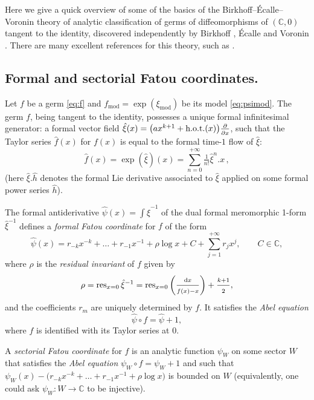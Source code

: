 \documentclass[a4paper,11pt]{amsart}
\numberwithin{equation}{section}
\newcommand{\C}{{\mathbb C}}
\newcommand{\mfrac}[2]{\tfrac{#1\strut}{#2\strut}}
\newcommand{\hot}{\mathrm{h.o.t.}}
\renewcommand{\d}{\ensuremath{\operatorname{d}\!}}
\newcommand{\res}{\operatorname{res}}
\newcommand{\tdd}[1]{\tfrac{\partial}{\partial #1 \vphantom{\hat X}}}
\newcommand{\model}{{\mathrm{mod}}}
\newcommand{\fmod}{f_\model}
\newcommand{\ximod}{\xi_\model}
\theoremstyle{definition}
\begin{document}
Here we give a quick overview of some of the basics of the Birkhoff--\'Ecalle--Voronin theory of analytic classification of germs of diffeomorphisms of $(\C,0)$ tangent to the identity,
discovered independently by Birkhoff \cite{Birkhoff}, \'Ecalle \cite{EcalleBouillot,Ecalle1,Ecalle,Ecalle2} and Voronin \cite{Voronin}.
There are many excellent references for this theory, such as \cite{ Bracci, IlYa, Loray}.




\subsection{Formal and sectorial Fatou coordinates.}\label{sec:3.1}

Let $f$ be a germ \eqref{eq:f} and $\fmod=\exp(\ximod)$  be its model \eqref{eq:psimod}. 
The germ $f$, being tangent to the identity, possesses a unique formal infinitesimal generator: a formal vector field $\hat \xi(x)=\big(ax^{k+1}+\hot(x)\big)\tdd{x}$,  such that the Taylor series $\hat f(x)$ for $f(x)$ is equal to the formal time-$1$ flow of $\hat\xi$: 
\[\hat f(x)=\exp(\hat\xi)(x)=\sum_{n=0}^{+\infty}\tfrac{1}{n!}\hat\xi^{n}.x \,,\]
(here $\hat\xi.\hat h$ denotes the formal Lie derivative associated to $\hat\xi$ applied on some formal power series $\hat h$).

The formal antiderivative $\hat\psi(x)=\int\hat \xi^{-1}$ of the dual formal meromorphic 1-form $\hat\xi^{-1}$
defines a \emph{formal Fatou coordinate} for $f$ of the form 
\begin{equation}\label{eq:formalFatou}
	\hat\psi(x)=r_{-k}x^{-k}+\ldots+r_{-1}x^{-1}+\rho\log x+C+\sum_{j=1}^{+\infty}r_jx^j,\qquad C\in\mathbb C,
\end{equation}
where $\rho$ is the \emph{residual invariant} of $f$ given by	
\begin{equation}\label{eq:resit}
		\rho=\res_{x=0}\hat\xi^{-1}=\res_{x=0}\left(\mfrac{\d x}{f(x)-x}\right)+\mfrac{k+1}{2},
\end{equation}
and the coefficients $r_m$ are uniquely determined by $f$.
It satisfies the \emph{Abel equation}
\begin{equation*}\label{eq:Fatourelation}
	\hat\psi\circ f=\hat\psi+1,
\end{equation*} 
where $f$ is identified with its Taylor series at $0$.

A \emph{sectorial Fatou coordinate} for $f$ is an analytic function $\psi_W$ on some sector $W$ that satisfies the \emph{Abel equation} $\psi_W\circ f=\psi_W+1$ and
such that $\psi_W(x)-\big(r_{-k}x^{-k}+\ldots+r_{-1}x^{-1}+\rho\log x\big)$ is bounded on $W$ (equivalently, one could ask $\psi_W:W\to \mathbb C$ to be injective).
\end{document}
